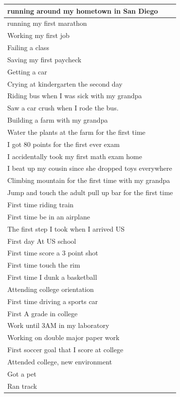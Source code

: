 \documentclass[
  .7em,
  letterpaper,
  DIV=11,
  numbers=noendperiod]{scrartcl}
\begin{document}
\begin{table}
\begin{tabular}{l}
\hline
running around my hometown in San Diego\\
\hline
running my first marathon\\
\hline
Working my first job\\
\hline
Failing a class\\
\hline
Saving my first paycheck\\
\hline
Getting a car\\
\hline
Crying at kindergarten the second day\\
\hline
Riding bus when I was sick with my grandpa\\
\hline
Saw a car crush when I rode the bus.\\
\hline
Building a farm with my grandpa\\
\hline
Water the plants at the farm for the first time\\
\hline
I got 80 points for the first ever exam\\
\hline
I accidentally took my first math exam home\\
\hline
I beat up my cousin since she dropped toys everywhere\\
\hline
Climbing mountain for the first time with my grandpa\\
\hline
Jump and touch the adult pull up bar for the first time\\
\hline
First time riding train\\
\hline
First time be in an airplane\\
\hline
The first step I took when I arrived US\\
\hline
First day At US school\\
\hline
First time score a 3 point shot\\
\hline
First time touch the rim\\
\hline
First time I dunk a basketball\\
\hline
Attending college orientation\\
\hline
First time driving a sports car\\
\hline
First A grade in college\\
\hline
Work until 3AM in my laboratory\\
\hline
Working on double major paper work\\
\hline
First soccer goal that I score at college\\
\hline
Attended college, new environment\\
\hline
Got a pet\\
\hline
Ran track\\

\end{tabular}
\end{table}
\end{document}
